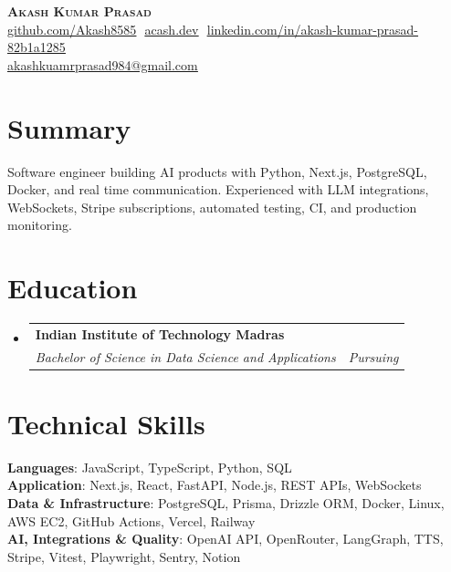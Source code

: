 \documentclass[letterpaper,11pt]{article}
\makeatletter
\newcommand{\resumeSubheading}[4]{
  \vspace{-2pt}\item
    \begin{tabular*}{0.97\textwidth}[t]{l@{\extracolsep{\fill}}r}
      \textbf{#1} & #2 \\
      \textit{\small#3} & \textit{\small #4} \\
    \end{tabular*}\vspace{-7pt}
}
\newcommand{\resumeSubHeadingListStart}{\begin{itemize}[leftmargin=0.15in, label={}]}
\newcommand{\resumeSubHeadingListEnd}{\end{itemize}}
\makeatother
\begin{document}
\begin{center}
  \textbf{\Huge \scshape Akash Kumar Prasad} \\ \vspace{7pt}
  \small
  \href{https://github.com/Akash8585}{\underline{github.com/Akash8585}} $  $
  \href{https://www.acash.dev}{\underline{acash.dev}} $  $
  \href{https://www.linkedin.com/in/akash-kumar-prasad-82b1a1285/}{\underline{linkedin.com/in/akash-kumar-prasad-82b1a1285}} \\
  \vspace{3pt}
  \href{mailto:akashkuamrprasad984@gmail.com}{\underline{akashkuamrprasad984@gmail.com}}
\end{center}

\section{Summary}
\small{Software engineer building AI products with Python, Next.js, PostgreSQL, Docker, and real time communication. Experienced with LLM integrations, WebSockets, Stripe subscriptions, automated testing, CI, and production monitoring.}

\section{Education}
\resumeSubHeadingListStart
  \resumeSubheading
    {Indian Institute of Technology Madras}{}
    {Bachelor of Science in Data Science and Applications}{Pursuing}
\resumeSubHeadingListEnd

\section{Technical Skills}
\begin{itemize}[leftmargin=0.15in, label={}]
  \small{\item{
    \textbf{Languages}{: JavaScript, TypeScript, Python, SQL} \\
    \textbf{Application}{: Next.js, React, FastAPI, Node.js, REST APIs, WebSockets} \\
    \textbf{Data \& Infrastructure}{: PostgreSQL, Prisma, Drizzle ORM, Docker, Linux, AWS EC2, GitHub Actions, Vercel, Railway} \\
    \textbf{AI, Integrations \& Quality}{: OpenAI API, OpenRouter, LangGraph, TTS, Stripe, Vitest, Playwright, Sentry, Notion}
  }}
\end{itemize}
\end{document}
